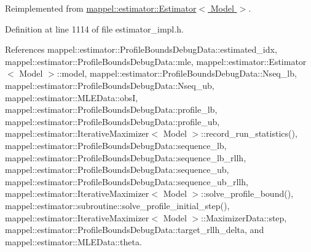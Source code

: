 Reimplemented from \hyperlink{classmappel_1_1estimator_1_1Estimator_a75c8db8e3151aa5bb2ce3190a613c05c}{mappel\+::estimator\+::\+Estimator$<$ Model $>$}.



Definition at line 1114 of file estimator\+\_\+impl.\+h.



References mappel\+::estimator\+::\+Profile\+Bounds\+Debug\+Data\+::estimated\+\_\+idx, mappel\+::estimator\+::\+Profile\+Bounds\+Debug\+Data\+::mle, mappel\+::estimator\+::\+Estimator$<$ Model $>$\+::model, mappel\+::estimator\+::\+Profile\+Bounds\+Debug\+Data\+::\+Nseq\+\_\+lb, mappel\+::estimator\+::\+Profile\+Bounds\+Debug\+Data\+::\+Nseq\+\_\+ub, mappel\+::estimator\+::\+M\+L\+E\+Data\+::obsI, mappel\+::estimator\+::\+Profile\+Bounds\+Debug\+Data\+::profile\+\_\+lb, mappel\+::estimator\+::\+Profile\+Bounds\+Debug\+Data\+::profile\+\_\+ub, mappel\+::estimator\+::\+Iterative\+Maximizer$<$ Model $>$\+::record\+\_\+run\+\_\+statistics(), mappel\+::estimator\+::\+Profile\+Bounds\+Debug\+Data\+::sequence\+\_\+lb, mappel\+::estimator\+::\+Profile\+Bounds\+Debug\+Data\+::sequence\+\_\+lb\+\_\+rllh, mappel\+::estimator\+::\+Profile\+Bounds\+Debug\+Data\+::sequence\+\_\+ub, mappel\+::estimator\+::\+Profile\+Bounds\+Debug\+Data\+::sequence\+\_\+ub\+\_\+rllh, mappel\+::estimator\+::\+Iterative\+Maximizer$<$ Model $>$\+::solve\+\_\+profile\+\_\+bound(), mappel\+::estimator\+::subroutine\+::solve\+\_\+profile\+\_\+initial\+\_\+step(), mappel\+::estimator\+::\+Iterative\+Maximizer$<$ Model $>$\+::\+Maximizer\+Data\+::step, mappel\+::estimator\+::\+Profile\+Bounds\+Debug\+Data\+::target\+\_\+rllh\+\_\+delta, and mappel\+::estimator\+::\+M\+L\+E\+Data\+::theta.

